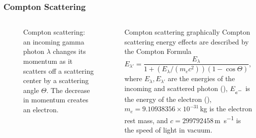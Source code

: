 \documentclass[aspectratio=169]{beamer}
\newcommand{\minus}{\scalebox{0.75}[1.0]{$-$}}
\begin{document}
\begin{frame}[noframenumbering]
  \frametitle{Compton Scattering}

  \begin{columns}[c]


  \begin{figure}[!t]
    \centering
    \resizebox{0.75\textwidth}{!}{%
      
    }
    \caption{
      Compton scattering: an incoming gamma photon $\lambda$ changes its momentum as it scatters off a scattering center by a scattering angle $\Theta$.
      The decrease in momentum creates an electron.
    }
    \label{fig:compton_scattering}
  \end{figure}


  \begin{block}{Compton scattering graphically}
  Compton scattering energy effects are described by the Compton Formula
  \begin{equation}
    E_{\lambda'} = \frac{E_{\lambda}}{1 + \left(E_{\lambda} / \left(m_e c^2\right)\right)\left(1 - \cos\Theta\right)},
    \label{eq:compton_formulae}
  \end{equation}
  where $E_{\lambda}, E_{\lambda'}$ are the energies of the incoming and scattered photon (\si{\joul}), $E_{e^{\minus}}$ is the energy of the electron (\si{\joul}), $m_e = 9.10938356\times10^{-31}\,$\si{\kilogram} is the electron rest mass, and $c = 299792458$\,\si{\meter\per\second} is the speed of light in vacuum.
  \end{block}

  \end{columns}

\end{frame}


\end{document}
